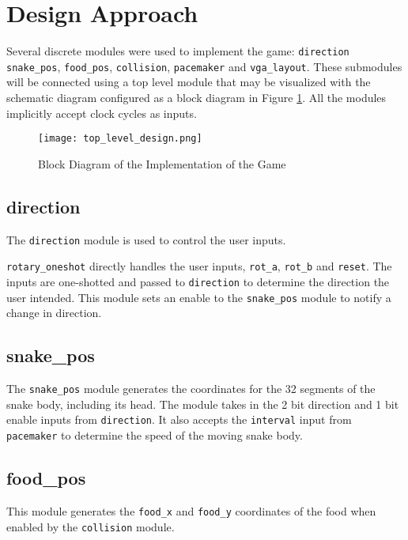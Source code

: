 \documentclass[paper=usletter, fontsize=12pt]{article}
\begin{document}
    \section{Design Approach}
    Several discrete modules were used to implement the game: \texttt{direction} \texttt{snake\_pos}, \texttt{food\_pos}, \texttt{collision}, \texttt{pacemaker} and \texttt{vga\_layout}. These submodules will be connected using a top level module that may be visualized with the schematic diagram configured as a block diagram in Figure \ref{fig:schematic}. All the modules implicitly accept clock cycles as inputs.

    \begin{figure}[ht]
        \begin{center}
            \texttt{[image: top\_level\_design.png]}
            \caption{Block Diagram of the Implementation of the Game} \label{fig:schematic}
        \end{center}
    \end{figure}
    \newpage

        \subsection{direction}
        The \texttt{direction} module is used to control the user inputs.

        \texttt{rotary\_oneshot} directly handles the user inputs, \texttt{rot\_a}, \texttt{rot\_b} and \texttt{reset}. The inputs are one-shotted and passed to \texttt{direction} to determine the direction the user intended. This module sets an enable to the \texttt{snake\_pos} module to notify a change in direction.

        \subsection{snake\_pos}
        The \texttt{snake\_pos} module generates the coordinates for the 32 segments of the snake body, including its head. The module takes in the 2 bit direction and 1 bit enable inputs from \texttt{direction}. It also accepts the \texttt{interval} input from \texttt{pacemaker} to determine the speed of the moving snake body.

        \subsection{food\_pos}
        This module generates the \texttt{food\_x} and \texttt{food\_y} coordinates of the food when enabled by the \texttt{collision} module.
\end{document}
